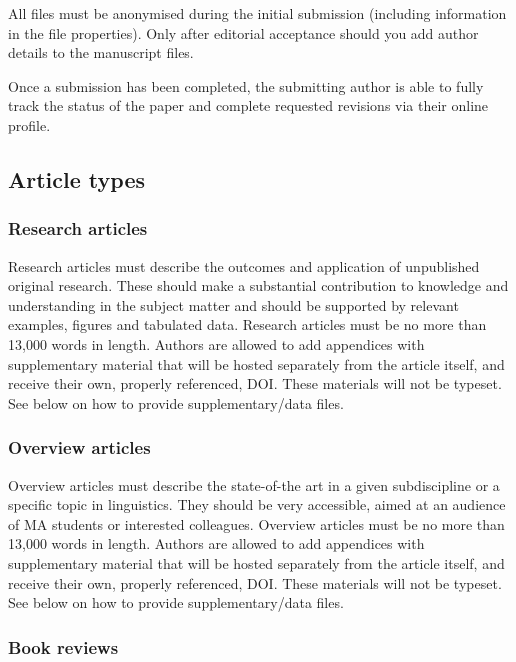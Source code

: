 \documentclass[cm,linguex]{glossa}
\begin{document}
All files must be anonymised during the initial submission (including
information in the file properties). Only after editorial acceptance
should you add author details to the manuscript files.

Once a submission has been completed, the submitting author is able to
fully track the status of the paper and complete requested revisions via
their online profile.

\hypertarget{article-types}{%
\subsection{Article types}\label{article-types}}

\hypertarget{research-articles}{%
\subsubsection{Research articles}\label{research-articles}}

Research articles must describe the outcomes and application of
unpublished original research. These should make a substantial
contribution to knowledge and understanding in the subject matter and
should be supported by relevant examples, figures and tabulated data.
Research articles must be no more than 13,000 words in length. Authors
are allowed to add appendices with supplementary material that will be
hosted separately from the article itself, and receive their own,
properly referenced, DOI. These materials will not be typeset. See below
on how to provide supplementary/data files.

\hypertarget{overview-articles}{%
\subsubsection{Overview articles}\label{overview-articles}}

Overview articles must describe the state-of-the art in a given
subdiscipline or a specific topic in linguistics. They should be very
accessible, aimed at an audience of MA students or interested
colleagues. Overview articles must be no more than 13,000 words in
length. Authors are allowed to add appendices with supplementary
material that will be hosted separately from the article itself, and
receive their own, properly referenced, DOI. These materials will not be
typeset. See below on how to provide supplementary/data files.

\hypertarget{book-reviews}{%
\subsubsection{Book reviews}\label{book-reviews}}
\end{document}
